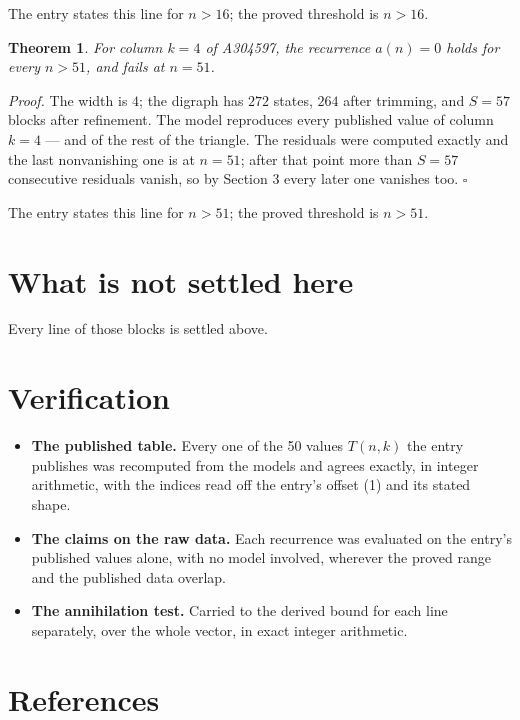 \documentclass[11pt]{article}
\newtheorem{theorem}{Theorem}
\theoremstyle{definition}
\begin{document}
The entry states this line for $n > 16$; the proved threshold is $n > 16$.

\begin{theorem} For column $k = 4$ of A304597, the recurrence $a(n) = 0$ holds for every $n > 51$, and fails at $n = 51$.\end{theorem}

{\itshape Proof.} The width is $4$; the digraph has $272$ states, $264$ after trimming, and $S = 57$ blocks after refinement. The model reproduces every published value of column $k = 4$ --- and of the rest of the triangle. The residuals were computed exactly and the last nonvanishing one is at $n = 51$; after that point more than $S = 57$ consecutive residuals vanish, so by Section 3 every later one vanishes too. $\square$

The entry states this line for $n > 51$; the proved threshold is $n > 51$.

\section{What is not settled here}

Every line of those blocks is settled above.

\section{Verification}

\begin{itemize}

\item {\bfseries The published table.} Every one of the 50 values $T(n,k)$ the entry publishes was recomputed from the models and agrees exactly, in integer arithmetic, with the indices read off the entry's offset (1) and its stated shape.

\item {\bfseries The claims on the raw data.} Each recurrence was evaluated on the entry's published values alone, with no model involved, wherever the proved range and the published data overlap.

\item {\bfseries The annihilation test.} Carried to the derived bound for each line separately, over the whole vector, in exact integer arithmetic.

\end{itemize}

\section{References}
\end{document}

